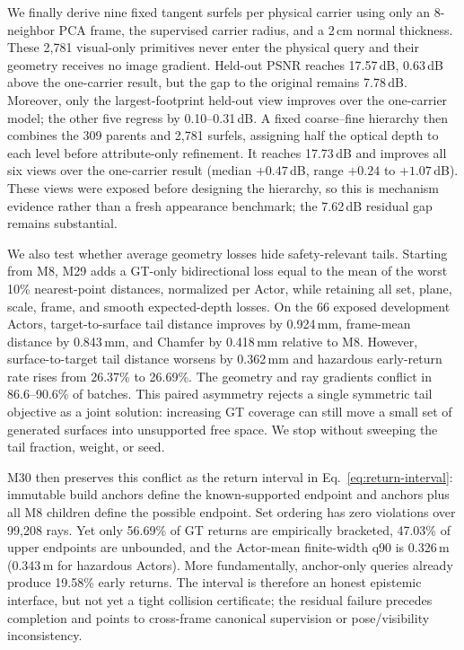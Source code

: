 We finally derive nine fixed tangent surfels per physical carrier using only an 8-neighbor PCA frame, the supervised carrier radius, and a 2\,cm normal thickness. These 2,781 visual-only primitives never enter the physical query and their geometry receives no image gradient. Held-out PSNR reaches 17.57\,dB, 0.63\,dB above the one-carrier result, but the gap to the original remains 7.78\,dB. Moreover, only the largest-footprint held-out view improves over the one-carrier model; the other five regress by 0.10--0.31\,dB. A fixed coarse--fine hierarchy then combines the 309 parents and 2,781 surfels, assigning half the optical depth to each level before attribute-only refinement. It reaches 17.73\,dB and improves all six views over the one-carrier result (median $+0.47$\,dB, range $+0.24$ to $+1.07$\,dB). These views were exposed before designing the hierarchy, so this is mechanism evidence rather than a fresh appearance benchmark; the 7.62\,dB residual gap remains substantial.

We also test whether average geometry losses hide safety-relevant tails. Starting from M8, M29 adds a GT-only bidirectional loss equal to the mean of the worst 10\% nearest-point distances, normalized per Actor, while retaining all set, plane, scale, frame, and smooth expected-depth losses. On the 66 exposed development Actors, target-to-surface tail distance improves by 0.924\,mm, frame-mean distance by 0.843\,mm, and Chamfer by 0.418\,mm relative to M8. However, surface-to-target tail distance worsens by 0.362\,mm and hazardous early-return rate rises from 26.37\% to 26.69\%. The geometry and ray gradients conflict in 86.6--90.6\% of batches. This paired asymmetry rejects a single symmetric tail objective as a joint solution: increasing GT coverage can still move a small set of generated surfaces into unsupported free space. We stop without sweeping the tail fraction, weight, or seed.

M30 then preserves this conflict as the return interval in Eq.~\ref{eq:return-interval}: immutable build anchors define the known-supported endpoint and anchors plus all M8 children define the possible endpoint. Set ordering has zero violations over 99,208 rays. Yet only 56.69\% of GT returns are empirically bracketed, 47.03\% of upper endpoints are unbounded, and the Actor-mean finite-width q90 is 0.326\,m (0.343\,m for hazardous Actors). More fundamentally, anchor-only queries already produce 19.58\% early returns. The interval is therefore an honest epistemic interface, but not yet a tight collision certificate; the residual failure precedes completion and points to cross-frame canonical supervision or pose/visibility inconsistency.

